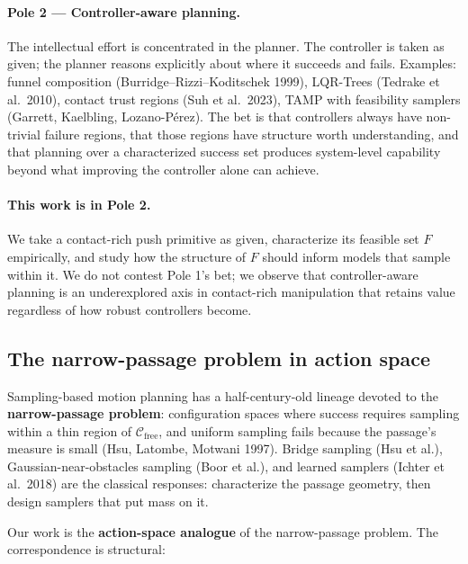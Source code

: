 \documentclass[11pt]{article}
\begin{document}
\paragraph{Pole 2 --- Controller-aware planning.}
The intellectual effort is concentrated in the planner. The controller is
taken as given; the planner reasons explicitly about where it succeeds and
fails. Examples: funnel composition (Burridge--Rizzi--Koditschek 1999),
LQR-Trees (Tedrake et al.\ 2010), contact trust regions (Suh et al.\ 2023),
TAMP with feasibility samplers (Garrett, Kaelbling, Lozano-P\'erez). The bet
is that controllers always have non-trivial failure regions, that those
regions have structure worth understanding, and that planning over a
characterized success set produces system-level capability beyond what
improving the controller alone can achieve.

\paragraph{This work is in Pole 2.}
We take a contact-rich push primitive as given, characterize its feasible set
$F$ empirically, and study how the structure of $F$ should inform models
that sample within it. We do not contest Pole 1's bet; we observe that
controller-aware planning is an underexplored axis in contact-rich
manipulation that retains value regardless of how robust controllers become.

\subsection{The narrow-passage problem in action space}

Sampling-based motion planning has a half-century-old lineage devoted to the
\textbf{narrow-passage problem}: configuration spaces where success requires
sampling within a thin region of $\mathcal{C}_{\text{free}}$, and uniform
sampling fails because the passage's measure is small (Hsu, Latombe, Motwani
1997). Bridge sampling (Hsu et al.), Gaussian-near-obstacles sampling (Boor
et al.), and learned samplers (Ichter et al.\ 2018) are the classical
responses: characterize the passage geometry, then design samplers that put
mass on it.

Our work is the \textbf{action-space analogue} of the narrow-passage problem.
The correspondence is structural:
\end{document}
